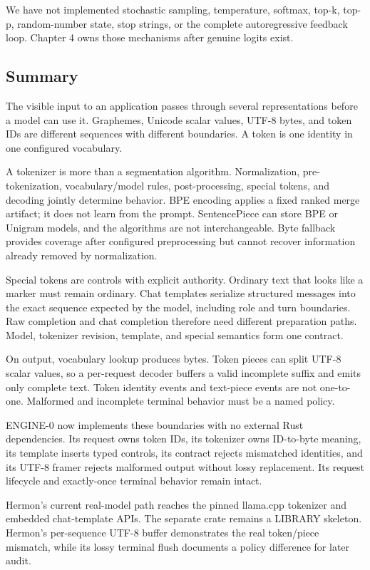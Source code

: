 \documentclass[
  10pt,
]{article}
\begin{document}
We have not implemented stochastic sampling, temperature, softmax,
top-k, top-p, random-number state, stop strings, or the complete
autoregressive feedback loop. Chapter 4 owns those mechanisms after
genuine logits exist.

\subsection{Summary}\label{summary-1}

The visible input to an application passes through several
representations before a model can use it. Graphemes, Unicode scalar
values, UTF-8 bytes, and token IDs are different sequences with
different boundaries. A token is one identity in one configured
vocabulary.

A tokenizer is more than a segmentation algorithm. Normalization,
pre-tokenization, vocabulary/model rules, post-processing, special
tokens, and decoding jointly determine behavior. BPE encoding applies a
fixed ranked merge artifact; it does not learn from the prompt.
SentencePiece can store BPE or Unigram models, and the algorithms are
not interchangeable. Byte fallback provides coverage after configured
preprocessing but cannot recover information already removed by
normalization.

Special tokens are controls with explicit authority. Ordinary text that
looks like a marker must remain ordinary. Chat templates serialize
structured messages into the exact sequence expected by the model,
including role and turn boundaries. Raw completion and chat completion
therefore need different preparation paths. Model, tokenizer revision,
template, and special semantics form one contract.

On output, vocabulary lookup produces bytes. Token pieces can split
UTF-8 scalar values, so a per-request decoder buffers a valid incomplete
suffix and emits only complete text. Token identity events and
text-piece events are not one-to-one. Malformed and incomplete terminal
behavior must be a named policy.

ENGINE-0 now implements these boundaries with no external Rust
dependencies. Its request owns token IDs, its tokenizer owns ID-to-byte
meaning, its template inserts typed controls, its contract rejects
mismatched identities, and its UTF-8 framer rejects malformed output
without lossy replacement. Its request lifecycle and exactly-once
terminal behavior remain intact.

Hermon's current real-model path reaches the pinned llama.cpp tokenizer
and embedded chat-template APIs. The separate
\texttt{} crate remains a LIBRARY skeleton.
Hermon's per-sequence UTF-8 buffer demonstrates the real token/piece
mismatch, while its lossy terminal flush documents a policy difference
for later audit.
\end{document}
